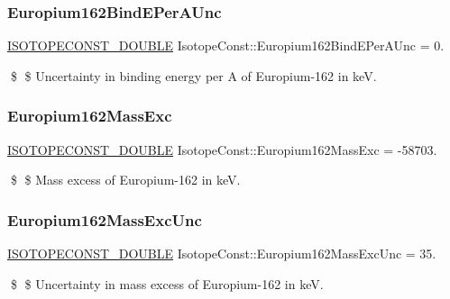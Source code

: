 \subsubsection{\texorpdfstring{Europium162\+Bind\+E\+Per\+A\+Unc}{Europium162BindEPerAUnc}}
{\footnotesize\ttfamily \mbox{\hyperlink{group___isotope_const-_macros_ga8f45a7272ce02c0b4c65c44636ed719a}{I\+S\+O\+T\+O\+P\+E\+C\+O\+N\+S\+T\+\_\+\+D\+O\+U\+B\+LE}} Isotope\+Const\+::\+Europium162\+Bind\+E\+Per\+A\+Unc = 0.}

\$ \$ Uncertainty in binding energy per A of Europium-\/162 in keV. \mbox{\label{group___isotope_const-_europium-_eu162_ga580050269b891c72ea4e86b1791d86a1}} 
\subsubsection{\texorpdfstring{Europium162\+Mass\+Exc}{Europium162MassExc}}
{\footnotesize\ttfamily \mbox{\hyperlink{group___isotope_const-_macros_ga8f45a7272ce02c0b4c65c44636ed719a}{I\+S\+O\+T\+O\+P\+E\+C\+O\+N\+S\+T\+\_\+\+D\+O\+U\+B\+LE}} Isotope\+Const\+::\+Europium162\+Mass\+Exc = -\/58703.}

\$ \$ Mass excess of Europium-\/162 in keV. \mbox{\label{group___isotope_const-_europium-_eu162_gaa94c6431714c68de40cc577492af9cbd}} 
\subsubsection{\texorpdfstring{Europium162\+Mass\+Exc\+Unc}{Europium162MassExcUnc}}
{\footnotesize\ttfamily \mbox{\hyperlink{group___isotope_const-_macros_ga8f45a7272ce02c0b4c65c44636ed719a}{I\+S\+O\+T\+O\+P\+E\+C\+O\+N\+S\+T\+\_\+\+D\+O\+U\+B\+LE}} Isotope\+Const\+::\+Europium162\+Mass\+Exc\+Unc = 35.}

\$ \$ Uncertainty in mass excess of Europium-\/162 in keV. \mbox{\label{group___isotope_const-_europium-_eu162_ga102b45137c17dca3254bf3e44b9a81f0}} 
